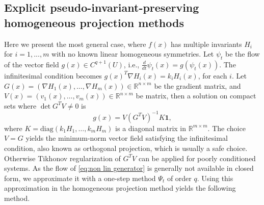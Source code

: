 \documentclass[final,3p,times]{elsarticle}
\newcommand{\R}{\mathbb{R}}
\newcommand{\diag}{\mathrm{diag}}
\begin{document}

\subsection{Explicit pseudo-invariant-preserving homogeneous projection methods}
Here we present the most general case, where $f(x)$ has multiple invariants $H_i$ for $i=1,...,m$ with no known linear homogeneous symmetries. Let $\psi_t$ be the flow of the vector field $g(x)\in C^{q+1}(U)$, i.e., $\frac{d}{dt}\psi_t(x)=g(\psi_t(x))$. The infinitesimal condition becomes $g(x)^T\nabla H_i(x)=k_i H_i(x)$, for each $i$. Let $G(x) = (\nabla H_1(x), \ldots, \nabla H_m(x))\in\R^{n\times m}$ be the gradient matrix, and $V(x) = (v_1(x), \ldots, v_m(x))\in\R^{n\times m}$ be matrix, then a solution on compact sets where $\det{G^TV}\ne 0$ is 
\begin{equation}\label{eq:non lin generator}
g(x)=V(G^TV)^{-1}K\mathbf{1},
\end{equation}
where $K = \diag(k_1 H_1, \ldots, k_m H_m)$ is a diagonal matrix in $\R^{m\times m}$. The choice $V = G$ yields the minimum-norm vector field satisfying the infinitesimal condition, also known as orthogonal projection, which is usually a safe choice. Otherwise Tikhonov regularization of $G^TV$ can be applied for poorly conditioned systems. As the flow of \eqref{eq:non lin generator} is generally not available in closed form, we approximate it with a one-step method $\Psi_t$ of order $q$. Using this approximation in the homogeneous projection method yields the following method.
 
\end{document}
